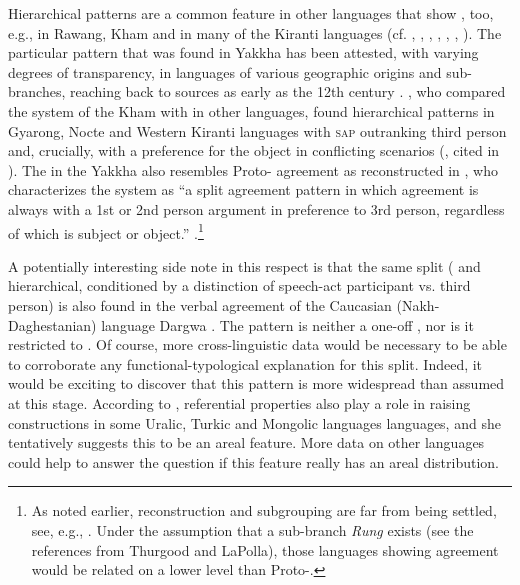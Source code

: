 Hierarchical patterns are a common feature  in other  languages that show , too, e.g., in Rawang, Kham and in many of the Kiranti languages (cf. \citealt[317]{DeLancey1989Verb}, \citealt[311]{LaPolla1992Dating}, \citealt[30]{LaPolla2003_Overview}, \citealt{LaPolla2007Hierarchical}, \citealt[473]{Ebert1987Grammatical}, \citealt[1]{DeLancey2011_Notes}, \citealt[398]{Watters2002A-grammar}). The particular pattern that was found in Yakkha has been attested, with varying degrees of transparency, in  languages of various geographic origins and sub-branches, reaching back to  sources as early as the 12th century \citep{Kepping1975_Subject, Kepping1994The-conjugation}. \citet{Watters2002A-grammar}, who compared the  system of the Kham  with  in other  languages, found hierarchical patterns in Gyarong, Nocte and Western Kiranti languages with \textsc{sap} outranking third person and, crucially, with a preference for the object in conflicting scenarios (\citealt{Nagano1984A-historical}, cited in \citealt[388]{Watters2002A-grammar}). The  in the Yakkha  also resembles Proto- agreement as reconstructed in \citet{DeLancey1989Verb}, who characterizes the system as  “a split  agreement pattern in which agreement is always with a 1st or 2nd person argument in preference to 3rd person, regardless of which is subject or object.” \citep[317]{DeLancey1989Verb}.\footnote{As noted earlier,  reconstruction and subgrouping are far from being settled, see, e.g., \citet{Thurgood1984The-Rung, DeLancey1989Verb, DeLancey2010_Towards, DeLancey2011_Notes, LaPolla1992Dating, LaPolla2012_Comments, Jacques2012_Agreement}. Under the assumption that  a sub-branch \emph{Rung} exists (see the references from Thurgood and LaPolla), those  languages showing agreement would be related on a lower level than Proto-.}


A potentially interesting side note in this respect is that the same  split ( and hierarchical, conditioned by a distinction of speech-act participant vs. third person) is also found in the verbal agreement of the Caucasian (Nakh-Daghestanian) language Dargwa \citep[208]{Zuniga2007_From}. The pattern is neither a one-off , nor is it restricted to . Of course, more cross-linguistic data would be necessary to be able to corroborate any functional-typo\-lo\-gic\-al explanation for this  split. Indeed, it would be exciting to discover that this pattern is more widespread than  assumed at this stage. According to \citet{Serdobolskaya2009_Raising}, referential properties also play a role  in raising constructions in some Uralic, Turkic and Mongolic languages languages, and she tentatively suggests this to be an areal feature. More data on other languages could help to answer the question if this feature really has an areal distribution.  


